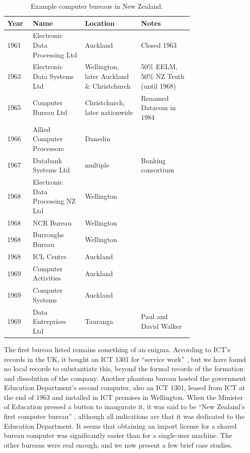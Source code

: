 \documentclass{IEEEcsmag}
\begin{document}
\begin{table}[h]
\begin{center}
\begin{tabular}{ |p{0.07\linewidth}|p{0.23\linewidth}|p{0.23\linewidth}|p{0.23\linewidth}<{\raggedright}| } 
 \hline
 Year & Name & Location & Notes\\ 
\hline
1961 & Electronic Data Processing Ltd & Auckland & Closed 1963\\\hline
1963 & Electronic Data Systems Ltd & Wellington, later Auckland \& Christchurch & 50\% EELM, 50\% NZ Truth (until 1968)\\\hline 
1965 & Computer Bureau Ltd & Christchurch, later nationwide & Renamed Datacom in 1984\\\hline
1966 & Allied Computer Processors & Dunedin & \\\hline
1967 & Databank Systems Ltd & multiple & Banking consortium\\\hline
1968 & Electronic Data Processing NZ Ltd& Wellington&\\\hline
1968 & NCR Bureau & Wellington &\\\hline
1968 & Burroughs Bureau & Wellington &\\\hline
1968 & ICL Centre& Auckland&\\\hline
1969 & Computer Activities& Auckland&\\\hline
1969 & Computer Systems& Auckland&\\\hline
1969 & Data Enterprises Ltd& Tauranga& Paul and David Walker\\\hline
\end{tabular}
\vspace{1ex}
\caption{\label{Bureaux}Example computer bureaus in New Zealand.}
\end{center}
\end{table}
The first bureau listed remains something of an enigma. According to ICT’s records in the UK, it bought an ICT 1301 for “service work” \cite{ccs-t2x1}, but we have found no local records to substantiate this, beyond the formal records of the formation and dissolution of the company. Another phantom bureau hosted the government Education Department’s second computer, also an ICT 1301, leased from ICT at the end of 1963 and installed in ICT premises in Wellington. When the Minister of Education pressed a button to inaugurate it, it was said to be “New Zealand’s first computer bureau” \cite{NatEd1963}, although all indications are that it was dedicated to the Education Department. It seems that obtaining an import license for a shared bureau computer was significantly easier than for a single-user machine. The other bureaus were real enough, and we now present a few brief case studies.
\end{document}
